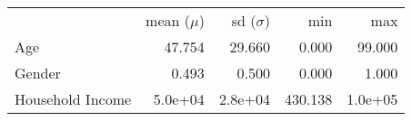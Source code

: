 \begin{tabular}{lrrrr} 
\hline \hline  & mean ($\mu$) & sd ($\sigma$) & min & max \\
Age &  47.754 &  29.660 &   0.000 &  99.000 \\
Gender &   0.493 &   0.500 &   0.000 &   1.000 \\
Household Income &  5.0e+04 &  2.8e+04 & 430.138 &  1.0e+05 \\
\hline \hline \end{tabular}
